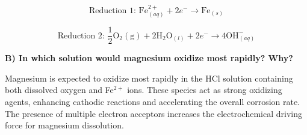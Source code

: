 \[
\text{Reduction 1: } \mathrm{Fe}^{2+}_{(aq)} + 2e^- \rightarrow \mathrm{Fe}_{(s)}
\]




\[
\text{Reduction 2: } \frac{1}{2}\mathrm{O}_2\mathrm{(g)} + 2\mathrm{H}_2\mathrm{O}_{(l)} + 2e^- \rightarrow 4\mathrm{OH}^{-}_{(aq)}
\]



\vspace{0.5cm}

\textbf{B) In which solution would magnesium oxidize most rapidly? Why?}

Magnesium is expected to oxidize most rapidly in the HCl solution containing both dissolved oxygen and Fe\(^{2+}\) ions. These species act as strong oxidizing agents, enhancing cathodic reactions and accelerating the overall corrosion rate. The presence of multiple electron acceptors increases the electrochemical driving force for magnesium dissolution.

